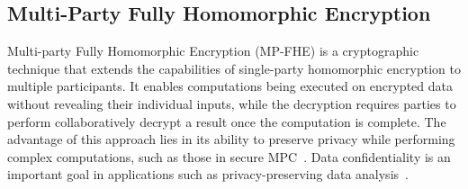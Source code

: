 




\subsection{Multi-Party Fully Homomorphic Encryption}
Multi-party Fully Homomorphic Encryption (MP-FHE) is a cryptographic technique that extends the capabilities of single-party homomorphic encryption to multiple participants. It enables computations being executed on encrypted data without revealing their individual inputs, while the decryption requires parties to perform collaboratively decrypt a result once the computation is complete. The advantage of this approach lies in its ability to preserve privacy while performing complex computations, such as those in secure MPC~\cite{Shamir}. Data confidentiality is an important goal in applications such as privacy-preserving data analysis~\cite{mouchet2021multiparty}.


